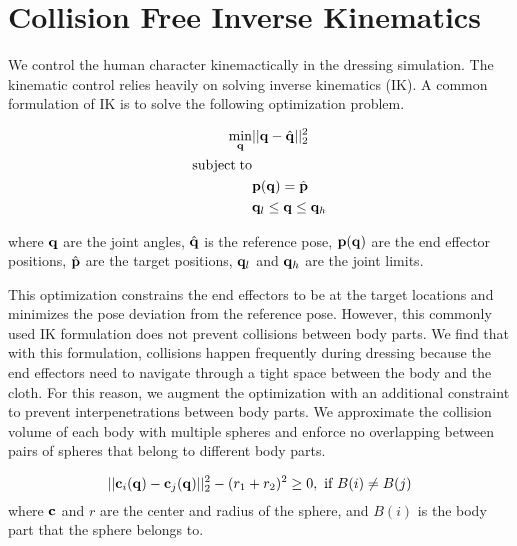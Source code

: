\section{Collision Free Inverse Kinematics}

We control the human character kinemactically in the dressing simulation. The kinematic control relies heavily on solving inverse kinematics (IK). A common formulation of IK is to solve the following optimization problem.

\begin{align}
\label{eq:IK}
  \min_{\mathbf{q}} & ||\mathbf{q} - \hat{\mathbf{q}}||_2^2 \\
  \nonumber  \mathrm{subject\;} \mathrm{to} & \\
  \label{eq:endEffectorConstraint}
  &\mathbf{p}(\mathbf{q}) = \hat{\mathbf{p}}\\
\nonumber   &\mathbf{q}_{l} \leq \mathbf{q} \leq \mathbf{q}_{h}
\end{align}

where $\mathbf{q}$ are the joint angles, $\hat{\mathbf{q}}$ is the reference pose, $\mathbf{p}(\mathbf{q})$ are the end effector positions, $\hat{\mathbf{p}}$ are the target positions, $\mathbf{q}_l$ and $\mathbf{q}_h$ are the joint limits.

This optimization constrains the end effectors to be at the target locations and minimizes the pose deviation from the reference pose. However, this commonly used IK formulation does not prevent collisions between body parts. We find that with this formulation, collisions happen frequently during dressing because the end effectors need to navigate through a tight space between the body and the cloth. For this reason, we augment the optimization with an additional constraint to prevent interpenetrations between body parts. We approximate the collision volume of each body with multiple spheres and enforce no overlapping between pairs of spheres that belong to different body parts.

\begin{equation}
  ||\mathbf{c}_i(\mathbf{q}) - \mathbf{c}_j(\mathbf{q})||_2^2 - (r_1 + r_2)^2 \geq 0,\mbox{ if }B(i) \neq B(j)
  \label{eq:collision}
\end{equation}
where $\mathbf{c}$ and $r$ are the center and radius of the sphere, and $B(i)$ is the body part that the sphere belongs to.

